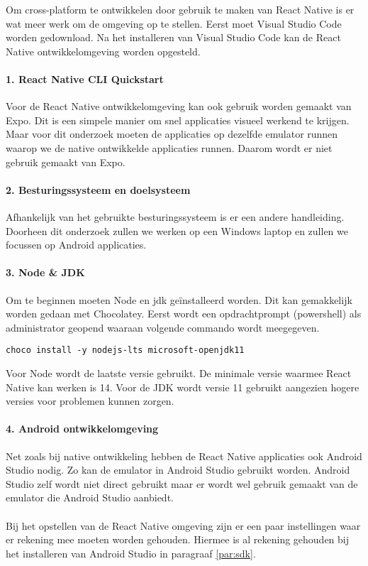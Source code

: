 Om cross-platform te ontwikkelen door gebruik te maken van React Native is er wat meer werk om 
de omgeving op te stellen. Eerst moet Visual Studio Code worden gedownload. 
Na het installeren van Visual Studio Code kan de React Native ontwikkelomgeving worden opgesteld. 

\paragraph{1. React Native CLI Quickstart}
Voor de React Native ontwikkelomgeving kan ook gebruik worden gemaakt van Expo. 
Dit is een simpele manier om snel applicaties visueel werkend te krijgen. 
Maar voor dit onderzoek moeten de applicaties op dezelfde emulator runnen waarop we de native 
ontwikkelde applicaties runnen. Daarom wordt er niet gebruik gemaakt van Expo.

\paragraph{2. Besturingssysteem en doelsysteem}
Afhankelijk van het gebruikte besturingssysteem is er een andere handleiding. 
Doorheen dit onderzoek zullen we werken op een Windows laptop en zullen we focussen op Android applicaties.

\paragraph{3. Node \& JDK}
Om te beginnen moeten \Gls{Node} en \acrshort{jdk} geïnstalleerd worden. Dit kan gemakkelijk 
worden gedaan met \Gls{Chocolatey}. Eerst wordt een 
opdrachtprompt (powershell) als administrator geopend waaraan volgende commando wordt meegegeven.
\begin{verbatim}
choco install -y nodejs-lts microsoft-openjdk11
\end{verbatim}
Voor Node wordt de laatste versie gebruikt. De minimale versie waarmee React Native kan werken is 14. 
Voor de JDK wordt versie 11 gebruikt aangezien hogere versies voor problemen kunnen zorgen.

\paragraph{4. Android ontwikkelomgeving}
Net zoals bij native ontwikkeling hebben de React Native applicaties ook Android Studio nodig. 
Zo kan de emulator in Android Studio gebruikt worden. 
Android Studio zelf wordt niet direct gebruikt maar er wordt wel gebruik gemaakt van de 
emulator die Android Studio aanbiedt.
\\\\
Bij het opstellen van de React Native omgeving zijn er een paar instellingen waar er rekening 
mee moeten worden gehouden. Hiermee is al rekening gehouden bij het installeren van Android Studio 
in paragraaf \ref{par:sdk}.

